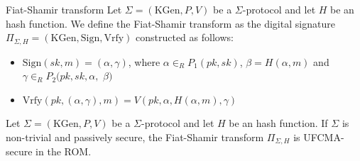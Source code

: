 \documentclass[a4paper, 12pt]{report}
\begin{document}
    \begin{frameddefn}{Fiat-Shamir transform}
        Let $\Sigma = (\mathrm{KGen}, P, V)$ be a $\Sigma$-protocol and let $H$ be an hash function. We define the Fiat-Shamir transform as the digital signature $\Pi_{\Sigma, H} = (\mathrm{KGen}, \mathrm{Sign}, \mathrm{Vrfy})$ constructed as follows:
        \begin{itemize}
            \item $\mathrm{Sign}(sk, m) = (\alpha, \gamma)$, where $\alpha \in_R P_1(pk,sk)$, $\beta = H(\alpha, m)$ and $\gamma \in_R P_2(pk,sk,\alpha,$ $\beta)$
            \item $\mathrm{Vrfy}(pk, (\alpha, \gamma), m) = V(pk, \alpha, H(\alpha, m), \gamma)$
        \end{itemize}
    \end{frameddefn}

    \begin{framedthm}{}
        Let $\Sigma = (\mathrm{KGen}, P, V)$ be a $\Sigma$-protocol and let $H$ be an hash function. If $\Sigma$ is non-trivial and passively secure, the Fiat-Shamir transform $\Pi_{\Sigma, H}$ is UFCMA-secure in the ROM.
    \end{framedthm}
\end{document}
